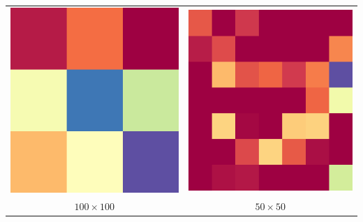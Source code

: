 \begin{center}
	\begin{tabular}{c c}
		\includegraphics[scale=0.5]{spot_100_100.png} & \includegraphics[scale=0.5]{spot_50_50.png} \\
		$100 \times 100$  & $50 \times 50$ \\

\end{tabular}
\end{center}
